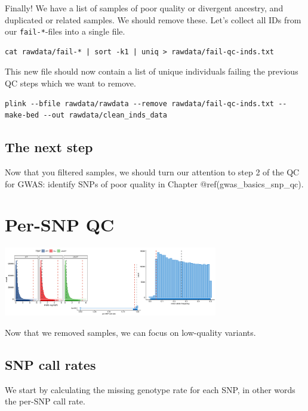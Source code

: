 \documentclass[
]{book}
\newcommand{\passthrough}[1]{#1}
\begin{document}
Finally! We have a list of samples of poor quality or divergent ancestry, and duplicated or related samples. We should remove these. Let's collect all IDs from our \passthrough{\lstinline!fail-*!}-files into a single file.

\begin{lstlisting}
cat rawdata/fail-* | sort -k1 | uniq > rawdata/fail-qc-inds.txt
\end{lstlisting}

This new file should now contain a list of unique individuals failing the previous QC steps which we want to remove.

\begin{lstlisting}
plink --bfile rawdata/rawdata --remove rawdata/fail-qc-inds.txt --make-bed --out rawdata/clean_inds_data
\end{lstlisting}

\hypertarget{the-next-step}{%
\section{The next step}\label{the-next-step}}

Now that you filtered samples, we should turn our attention to step 2 of the QC for GWAS: identify SNPs of poor quality in Chapter @ref(gwas\_basics\_snp\_qc).

\hypertarget{gwas_basics_snp_qc}{%
\chapter{Per-SNP QC}\label{gwas_basics_snp_qc}}

\includegraphics[width=0.7\textwidth,height=\textheight]{img/gwas_snp_qc.png}

Now that we removed samples, we can focus on low-quality variants.

\hypertarget{snp-call-rates}{%
\section{SNP call rates}\label{snp-call-rates}}

We start by calculating the missing genotype rate for each SNP, in other words the per-SNP call rate.
\end{document}
